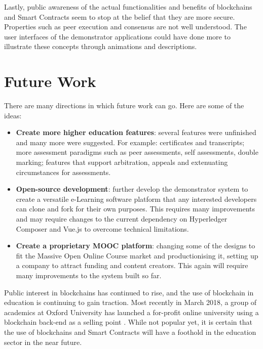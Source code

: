 Lastly, public awareness of the actual functionalities and benefits of blockchains 
and Smart Contracts seem to stop at the belief that they are more secure. Properties 
such as peer execution and consensus are not well understood. The user interfaces of 
the demonstrator applications could have done more to illustrate these concepts 
through animations and descriptions.

\section{Future Work}

There are many directions in which future work can go. Here are some of the ideas:

\begin{itemize}
    \item \textbf{Create more higher education features}: 
    several features were unfinished and many more were suggested. For example: 
    certificates and transcripts; more assessment paradigms such as peer assessments, 
    self assessments, double marking; features that support arbitration, 
    appeals and extenuating circumstances for assessments.
    \item \textbf{Open-source development}:
    further develop the demonstrator system to create a versatile e-Learning software 
    platform that any interested developers can clone and fork for their own purposes. 
    This requires many improvements and may require changes to the current dependency on 
    Hyperledger Composer and Vue.js to overcome technical limitations.
    \item \textbf{Create a proprietary MOOC platform}:
    changing some of the designs to fit the Massive Open Online Course market 
    and productionising it, setting up a company to attract funding and content creators. 
    This again will require many improvements to the system built so far.
\end{itemize}

Public interest in blockchains has continued to rise, and the use of blockchain in education is continuing 
to gain traction. Most recently in March 2018, a group of academics at Oxford University has launched 
a for-profit online university using a blockchain back-end as a selling point \citep{pells2018blockchainuni}. 
While not popular yet, it is certain that the use of blockchains and Smart Contracts will 
have a foothold in the education sector in the near future.









